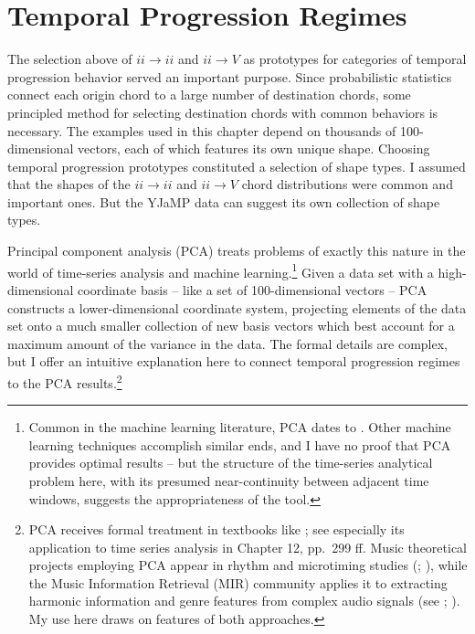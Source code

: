 \section{Temporal Progression Regimes}
The selection above of $ii \rightarrow ii$ and $ii \rightarrow V$ as prototypes for categories of temporal progression behavior served an important purpose.  Since probabilistic statistics connect each origin chord to a large number of destination chords, some principled method for selecting destination chords with common behaviors is necessary.  The examples used in this chapter depend on thousands of 100-dimensional vectors, each of which features its own unique shape.  Choosing temporal progression prototypes constituted a selection of shape types.  I assumed that the shapes of the $ii \rightarrow ii$ and $ii \rightarrow V$ chord distributions were common and important ones.  But the YJaMP data can suggest its own collection of shape types.

Principal component analysis (PCA) treats problems of exactly this nature in the world of time-series analysis and machine learning.\footnote{Common in the machine learning literature, PCA dates to \cite{pearson1901}.  Other machine learning techniques accomplish similar ends, and I have no proof that PCA provides optimal results -- but the structure of the time-series analytical problem here, with its presumed near-continuity between adjacent time windows, suggests the appropriateness of the tool.}  Given a data set with a high-dimensional coordinate basis -- like a set of 100-dimensional vectors -- PCA constructs a lower-dimensional coordinate system, projecting elements of the data set onto a much smaller collection of new basis vectors which best account for a maximum amount of the variance in the data.  The formal details are complex, but I offer an intuitive explanation here to connect temporal progression regimes to the PCA results.\footnote{PCA receives formal treatment in textbooks like \cite{jolliffe2002}; see especially its application to time series analysis in Chapter 12, pp.\ 299 ff.  Music theoretical projects employing PCA appear in rhythm and microtiming studies (\cite{repp1992}; \cite{benadon2015}), while the Music Information Retrieval (MIR) community applies it to extracting harmonic information and genre features from complex audio signals (see \cite{huang2014}; \cite{kaneko2010}).  My use here draws on features of both approaches.}

